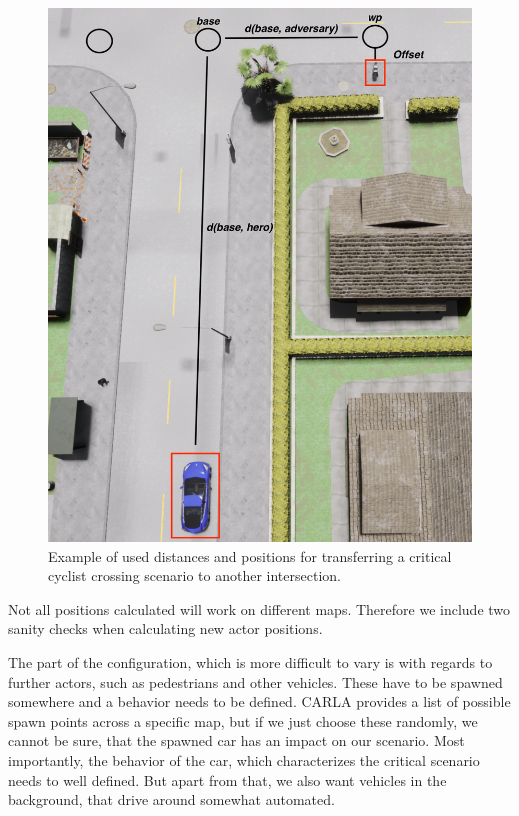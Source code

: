 \documentclass[conference, 11pt]{IEEEtran}
\begin{document}
\begin{figure}[ht]
	\centering
	\includegraphics[width=\linewidth]{figures/carla_distances.png}
	\caption{Example of used distances and positions for transferring a critical cyclist crossing scenario to another intersection. }
	\label{fig:distances_carla}
\end{figure}

Not all positions calculated will work on different maps. Therefore we include two sanity checks when calculating new actor positions. 

The part of the configuration, which is more difficult to vary is with regards to further actors, such as pedestrians and other vehicles.
These have to be spawned somewhere and a behavior needs to be defined.
CARLA provides a list of possible spawn points across a specific map, but if we just choose these randomly, we cannot be sure, that the spawned car has an impact on our scenario.
Most importantly, the behavior of the car, which characterizes the critical scenario needs to well defined.
But apart from that, we also want vehicles in the background, that drive around somewhat automated.
\end{document}
